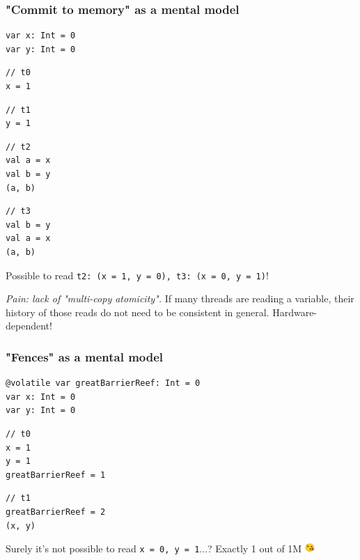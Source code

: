 \documentclass[aspectratio=1610, xcolor={dvipsnames}]{beamer}
\begin{document}
\begin{frame}[fragile]
    \frametitle{"Commit to memory" as a mental model}

    \begin{lstlisting}
var x: Int = 0
var y: Int = 0
    \end{lstlisting}
    
    \begin{multicols}{4}
        \begin{lstlisting}
// t0
x = 1
        \end{lstlisting}
        \columnbreak
        \begin{lstlisting}
// t1
y = 1
        \end{lstlisting}
        \columnbreak
        \begin{lstlisting}
// t2
val a = x
val b = y
(a, b)
        \end{lstlisting}
        \columnbreak
        \begin{lstlisting}
// t3
val b = y
val a = x
(a, b)
        \end{lstlisting}        
    \end{multicols}

    \pause
    Possible to read \lstinline|t2: (x = 1, y = 0), t3: (x = 0, y = 1)|!

    \pause
    \emph{Pain: lack of "multi-copy atomicity".} If many threads are reading a
    variable, their history of those reads do not need to be consistent in
    general. Hardware-dependent!

\end{frame}

\begin{frame}[fragile]
    \frametitle{"Fences" as a mental model}

\begin{lstlisting}
@volatile var greatBarrierReef: Int = 0
var x: Int = 0
var y: Int = 0
\end{lstlisting}

\begin{multicols}{2}
\begin{lstlisting}
// t0
x = 1
y = 1
greatBarrierReef = 1
\end{lstlisting}

\columnbreak

\begin{lstlisting}
// t1
greatBarrierReef = 2
(x, y)
\end{lstlisting}
\end{multicols}

\pause
Surely it's not possible to read \lstinline|x = 0, y = 1|...? \pause Exactly 1 out of 1M \includegraphics[height=1em]{fig/kiss.png}

\end{frame}
\end{document}
